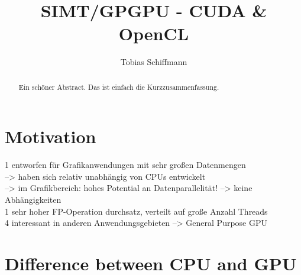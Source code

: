 \documentclass[a4paper,12pt]{llncs}
\numberwithin{equation}{section}
\begin{document}


\author{Tobias Schiffmann}

\title{SIMT/GPGPU - CUDA \& OpenCL}

\maketitle

\thispagestyle{empty}

\begin{abstract}
Ein schöner Abstract. Das ist einfach die Kurzzusammenfassung.
\end{abstract}


\section{Motivation}
  1 entworfen für Grafikanwendungen mit sehr großen Datenmengen\\
    --> haben sich relativ unabhängig von CPUs entwickelt\\
    --> im Grafikbereich: hohes Potential an Datenparallelität! --> keine Abhängigkeiten\\
  1 sehr hoher FP-Operation durchsatz, verteilt auf große Anzahl Threads\\
  4 interessant in anderen Anwendungsgebieten --> General Purpose GPU\\
    
    
\section{Difference between CPU and GPU}
\end{document}

